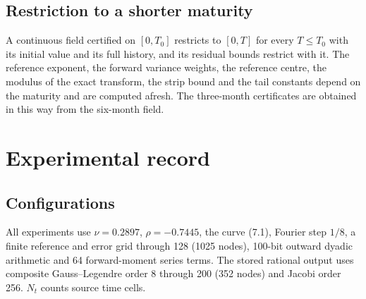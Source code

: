 \documentclass[11pt,a4paper]{article}
\begin{document}
\setcounter{subsection}{2}\subsection{Restriction to a shorter maturity}

A continuous field certified on \([0,T_0]\) restricts to \([0,T]\) for every \(T\le T_0\) with its initial value and its full history, and its residual bounds restrict with it. The reference exponent, the forward variance weights, the reference centre, the modulus of the exact transform, the strip bound and the tail constants depend on the maturity and are computed afresh. The three-month certificates are obtained in this way from the six-month field.

\setcounter{section}{4}\section{Experimental record}

\setcounter{subsection}{0}\subsection{Configurations}

All experiments use \(\nu=0.2897\), \(\rho=-0.7445\), the curve (7.1), Fourier step \(1/8\), a finite reference and error grid through 128 (1025 nodes), 100-bit outward dyadic arithmetic and 64 forward-moment series terms. The stored rational output uses composite Gauss–Legendre order 8 through 200 (352 nodes) and Jacobi order 256. \(N_t\) counts source time cells.
\end{document}
